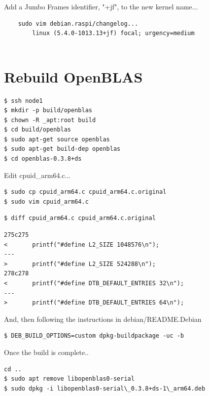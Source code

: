 \documentclass{report}
\begin{document}
Add a Jumbo Frames identifier, "+jf", to the new kernel name...

\begin{verbatim}
    sudo vim debian.raspi/changelog...
        linux (5.4.0-1013.13+jf) focal; urgency=medium
        
\end{verbatim}


%
%
\chapter{Rebuild OpenBLAS}

\lstset{style=type}
\begin{lstlisting}
$ ssh node1
$ mkdir -p build/openblas
$ chown -R _apt:root build
$ cd build/openblas
$ sudo apt-get source openblas
$ sudo apt-get build-dep openblas
$ cd openblas-0.3.8+ds
\end{lstlisting}


Edit cpuid\_arm64.c...

\lstset{style=type}
\begin{lstlisting}
$ sudo cp cpuid_arm64.c cpuid_arm64.c.original
$ sudo vim cpuid_arm64.c
\end{lstlisting}


\lstset{style=type}
\begin{lstlisting}
$ diff cpuid_arm64.c cpuid_arm64.c.original
\end{lstlisting}

\lstset{style=type}
\begin{lstlisting}
275c275
<       printf("#define L2_SIZE 1048576\n");
---
>       printf("#define L2_SIZE 524288\n");
278c278
<       printf("#define DTB_DEFAULT_ENTRIES 32\n");
---
>       printf("#define DTB_DEFAULT_ENTRIES 64\n");
\end{lstlisting}


And, then following the instructions in debian/README.Debian

\lstset{style=type}
\begin{lstlisting}
$ DEB_BUILD_OPTIONS=custom dpkg-buildpackage -uc -b
\end{lstlisting}

Once the build is complete..

\lstset{style=type}
\begin{lstlisting}
cd ..
$ sudo apt remove libopenblas0-serial
$ sudo dpkg -i libopenblas0-serial\_0.3.8+ds-1\_arm64.deb
\end{lstlisting}
\end{document}
